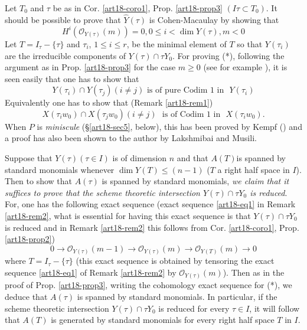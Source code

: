 \begin{remark}\label{art18-rem3}
Let $T_0$ and $\tau$ be as in Cor. \ref{art18-coro1}, Prop. \ref{art18-prop3} $(I \tau \subset T_0)$. It should be possible to prove that $\hat{Y}(\tau)$ is Cohen-Macaulay by showing that 
\begin{equation*}
H^i (\mathscr{O}_{Y(\tau)} (m)) =0, 0 \leqslant i < \dim Y (\tau), m < 0 \tag{*}
\end{equation*}
Let $T = I_\tau - \{\tau\}$ and $\tau_i$, $1\leqslant i \leqslant r$, be the minimal element of $T$ so that $Y(\tau_i)$ are the irreducible components of $Y(\tau) \cap \tau Y_0$. For proving (*), following the argument as in Prop. \ref{art18-prop3} for the case $m \geqslant 0$ (see for example \cite{art18-key13}), it is seen easily that one has to show that 
$$
Y (\tau_i) \cap Y (\tau_j)  (i \neq j) \text{ is of pure  Codim 1 in ~} Y(\tau_i)
$$
Equivalently one has to show that (\cf Remark \ref{art18-rem1})
$$
X(\tau_i w_0) \cap X(\tau_j w_0) (i \neq j) \text{~ is of Codim 1 in ~}  X (\tau_i w_0).
$$
When $P$ is {\em miniscule} (\cf \S \ref{art18-sec5}, below), this has been proved by Kempf (\cf \cite{art18-key11}) and a proof has also been shown to the author by Lakshmibai and Musili.
\end{remark}

\begin{remark}\label{art18-rem4}
Suppose that $Y(\tau) (\tau \in I)$ is of dimension $n$ and that $A(T)$\pageoriginale is spanned by standard monomials whenever $\dim Y(T) \leqslant (n-1)$ ($T$ a right half space in $I$). Then to show that $A(\tau)$ is spanned by standard monomials, {\em we claim that it suffices to prove that the scheme theoretic intersection $Y(\tau) \cap \tau Y_0$ is reduced}. For, one has the following exact sequence (\cf exact sequence \ref{art18-eq1} in Remark \ref{art18-rem2}, what is essential for having this exact sequence is that $Y(\tau) \cap \tau Y_0$ is reduced and in Remark \ref{art18-rem2} this follows from Cor. \ref{art18-coro1}, Prop. \ref{art18-prop2})
\begin{equation*}
0 \to \mathscr{O}_{Y(\tau)} (m-1) \to \mathscr{O}_{Y(\tau)} (m) \to \mathscr{O}_{Y(T)} (m) \to 0 \tag{*}
\end{equation*}
where $T = I_\tau - \{\tau\}$ (this exact sequence is obtained by tensoring the exact sequence \ref{art18-eq1} of Remark \ref{art18-rem2} by $\mathscr{O}_{Y(\tau)} (m)$). Then as in the proof of Prop. \ref{art18-prop3}, writing the cohomology exact sequence for (*), we deduce that $A(\tau)$ is spanned by standard monomials. In particular, if the scheme theoretic intersection $Y(\tau) \cap \tau Y_0$ is reduced for every $\tau \in I$, it will follow that $A(T)$ is generated by standard monomials for every right half space $T$ in $I$.
\end{remark}

